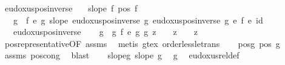 \begin{isabellebody}
\isanewline
{}\isamarkupfalse%
\ eudoxus{\isacharunderscore}{\kern0pt}pos{\isacharunderscore}{\kern0pt}inverse{\isacharcolon}{\kern0pt}\isanewline
\ \ \ {\isachardoublequoteopen}slope\ f{\isachardoublequoteclose}\ {\isachardoublequoteopen}pos\ f{\isachardoublequoteclose}\isanewline
\ \ \ g\ \ {\isachardoublequoteopen}f\ {\isasymsim}\isactrlsub e\ g{\isachardoublequoteclose}\ {\isachardoublequoteopen}slope\ {\isacharparenleft}{\kern0pt}eudoxus{\isacharunderscore}{\kern0pt}pos{\isacharunderscore}{\kern0pt}inverse\ g{\isacharparenright}{\kern0pt}{\isachardoublequoteclose}\ {\isachardoublequoteopen}eudoxus{\isacharunderscore}{\kern0pt}pos{\isacharunderscore}{\kern0pt}inverse\ g\ {\isacharasterisk}{\kern0pt}\isactrlsub e\ f\ {\isasymsim}\isactrlsub e\ id{\isachardoublequoteclose}\ \isanewline
%
\isadelimproof
%
\endisadelimproof
%
\isatagproof
{}\isamarkupfalse%
\ {\isacharminus}{\kern0pt}\isanewline
\ \ \isamarkupfalse%
\ {\isacharquery}{\kern0pt}{\isasymphi}\ {\isacharequal}{\kern0pt}\ eudoxus{\isacharunderscore}{\kern0pt}pos{\isacharunderscore}{\kern0pt}inverse\isanewline
\ \ \isamarkupfalse%
\ g\ \ g{\isacharcolon}{\kern0pt}\ {\isachardoublequoteopen}f\ {\isasymsim}\isactrlsub e\ g{\isachardoublequoteclose}\ {\isachardoublequoteopen}g\ z\ {\isasymge}\ {}\ {\isasymLongrightarrow}\ z\ {\isachargreater}{\kern0pt}\ {}{\isachardoublequoteclose}\ \ z\ \isamarkupfalse%
\ pos{\isacharunderscore}{\kern0pt}representative{\isacharprime}{\kern0pt}{\isacharbrackleft}{\kern0pt}OF\ assms{\isacharbrackright}{\kern0pt}\ \isamarkupfalse%
\ {\isacharparenleft}{\kern0pt}metis\ gt{\isacharunderscore}{\kern0pt}ex\ order{\isacharunderscore}{\kern0pt}less{\isacharunderscore}{\kern0pt}le{\isacharunderscore}{\kern0pt}trans{\isacharparenright}{\kern0pt}\isanewline
\ \ \isamarkupfalse%
\ pos{\isacharunderscore}{\kern0pt}g{\isacharcolon}{\kern0pt}\ {\isachardoublequoteopen}pos\ g{\isachardoublequoteclose}\ \isamarkupfalse%
\ assms\ pos{\isacharunderscore}{\kern0pt}cong\ \isamarkupfalse%
\ blast\isanewline
\ \ \isamarkupfalse%
\ slope{\isacharunderscore}{\kern0pt}g{\isacharcolon}{\kern0pt}\ {\isachardoublequoteopen}slope\ g{\isachardoublequoteclose}\ \isamarkupfalse%
\ g\ \isamarkupfalse%
\ eudoxus{\isacharunderscore}{\kern0pt}rel{\isacharunderscore}{\kern0pt}def\ \isamarkupfalse%

\end{isabellebody}
